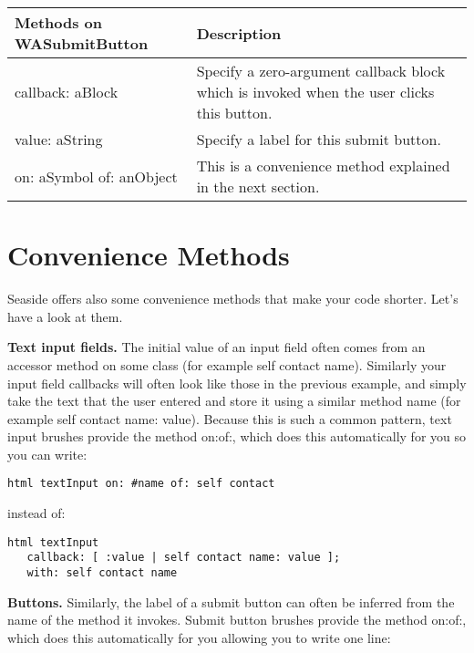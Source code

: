 \documentclass[a4paper,10pt,twoside]{book}
\newcommand{\ct}[1]{{\small\ttfamily\textup{#1}}}
\begin{document}
\begin{tabularx}{\textwidth}{lX}
\textbf{Methods on \ct{WASubmitButton} }&\textbf{Description}\\ \hline
 \index{WASubmitButton!callback: aBlock} \ct{callback: aBlock}& Specify a zero-argument callback block which is invoked when the user clicks this button. \\
 \index{WASubmitButton!value: aString} \ct{value: aString}& Specify a label for this submit button.\\
 \index{WASubmitButton!on: aSymbol of: anObject} \ct{on: aSymbol of: anObject}&This is a convenience method explained in the next section.\\
\end{tabularx}

\section{Convenience Methods}
\label{book:fundamentals:forms:convenience}

Seaside offers also some convenience methods that make your code shorter. Let's have a look at them. 

\textbf{Text input fields.} The initial value of an input field often comes from an accessor method on some class (for example \ct{self contact name}). Similarly your input field callbacks will often look like those in the previous example, and simply take the text that the user entered and store it using a similar method name (for example \ct{self contact name: value}). Because this is such a common pattern, text input brushes provide the method  \ct{on:of:}, which does this automatically for you  so you can write:

\begin{lstlisting}
html textInput on: #name of: self contact
\end{lstlisting}

instead of:

\begin{lstlisting}
html textInput
   callback: [ :value | self contact name: value ];
   with: self contact name
\end{lstlisting}

\textbf{Buttons.} Similarly, the label of a submit button can often be inferred from the name of the method it invokes. Submit button brushes provide the method  \ct{on:of:}, which does this automatically for you  allowing you to write one line:
\end{document}
